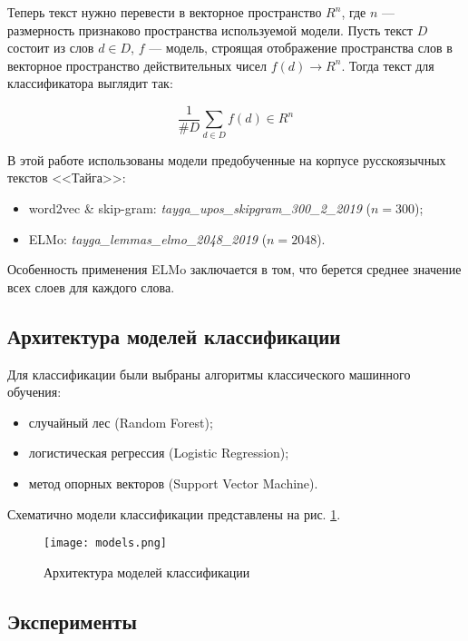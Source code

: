 Теперь текст нужно перевести в векторное пространство $R^n$, где $n$ --- размерность признаково пространства используемой модели. Пусть текст $D$ состоит из слов $d \in D$, $f$ --- модель, строящая отображение пространства слов в векторное пространство действительных чисел $f(d) \to R^n$. Тогда текст для классификатора выглядит так:

\begin{equation*}
 \frac{1}{\#D}\sum_{d \in D} f(d) \in R^n
\end{equation*}

В этой работе использованы модели предобученные на корпусе русскоязычных текстов <<Тайга>>:

\bigskip
\begin{itemize}
 \item word2vec \& skip-gram: \textit{tayga\_upos\_skipgram\_300\_2\_2019} ($n = 300$);
 \item ELMo: \textit{tayga\_lemmas\_elmo\_2048\_2019} ($n = 2048$).
\end{itemize}

\bigskip
Особенность применения ELMo заключается в том, что берется среднее значение всех слоев для каждого слова.

\subsection{Архитектура моделей классификации}

Для классификации были выбраны алгоритмы классического машинного обучения:

\bigskip
\begin{itemize}
 \item случайный лес (Random Forest);
 \item логистическая регрессия (Logistic Regression);
 \item метод опорных векторов (Support Vector Machine).
\end{itemize}

\bigskip
Схематично модели классификации представлены на рис. \ref{fig:models}.

\begin{figure}[ht]
    \centering
    \texttt{[image: models.png]}
    \caption{Архитектура моделей классификации}
    \label{fig:models}
\end{figure}


\subsection{Эксперименты}


